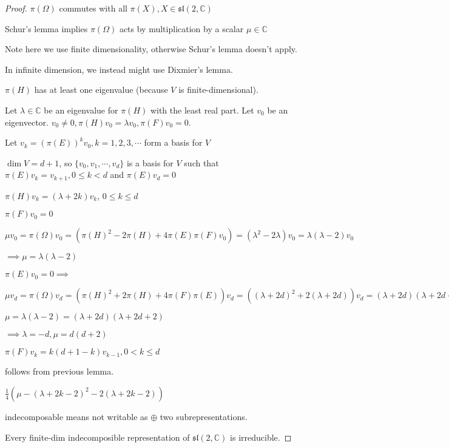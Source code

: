 \documentclass{article}
\theoremstyle{definition}
\begin{document}
\begin{proof}
    \(\pi(\Omega)\) commutes with all \(\pi(X), X\in \mathfrak{sl}(2,\mathbb{C})\)
    
    Schur's lemma implies \(\pi(\Omega)\) acts by multiplication by a scalar \(\mu\in \mathbb{C}\)
    
    Note here we use finite dimensionality, otherwise Schur's lemma doesn't apply.

    In infinite dimension, we instead might use Dixmier's lemma.

    \(\pi(H)\) has at least one eigenvalue (because \(V\) is finite-dimensional).
    
    Let \(\lambda \in \mathbb{C}\) be an eigenvalue for \(\pi(H)\) with the least real part. Let \(v_0\) be an eigenvector. \(v_0 \neq 0, \pi(H)v_0 = \lambda v_0,\pi(F)v_0 = 0\).

    Let \(v_k = (\pi(E))^k v_0, k=1,2,3,\cdots\) form a basis for \(V\) 

    \(\dim V = d+1\), so \(\{ v_0, v_1,\cdots,v_d \} \) is a basis for \(V\) such that \(\pi (E)v_k = v_{k+1}, 0 \leq k < d\) and \(\pi(E)v_d = 0\)    

    \(\pi(H)v_k = (\lambda + 2k)v_k\), \(0 \leq k \leq d\) 
    
    \(\pi(F)v_0 = 0\)
    
    \(\mu v_0 = \pi(\Omega)v_0 = (\pi(H)^2 - 2\pi(H)+4\pi(E)\pi(F)v_0)=(\lambda^2 - 2\lambda)v_0 = \lambda(\lambda - 2)v_0\)
    
    \(\implies \mu = \lambda (\lambda -2)\)
    
    \(\pi(E)v_0 = 0 \implies \)
    
    \(\mu v_d = \pi(\Omega)v_d = (\pi(H)^2 + 2\pi(H) + 4\pi(F)\pi (E))v_d = ((\lambda+2d)^2 + 2(\lambda + 2d))v_d = (\lambda + 2d)(\lambda + 2d + 2)v_d\)
    
    \(\mu = \lambda (\lambda -2) = (\lambda + 2d)(\lambda + 2d + 2)\)
    
    \(\implies \lambda =-d, \mu = d(d+2)\)
    
    \(\pi(F)v_k = k(d+1-k)v_{k-1}, 0 < k \leq d\)
    
    follows from previous lemma.

    \(\frac{1}{4}(\mu - (\lambda + 2k - 2)^2 - 2(\lambda + 2k -2))\)
    
    indecomposable means not writable as \(\oplus\) two subrepresentations.
    
    Every finite-dim indecomposible representation of \(\mathfrak{sl}(2,\mathbb{C})\) is irreducible.
    
    

\end{proof}
\end{document}

